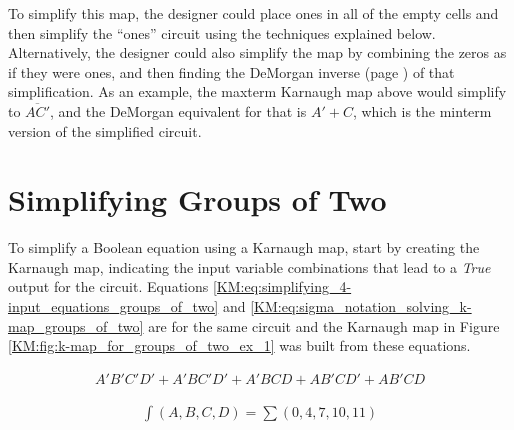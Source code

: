 To simplify this map, the designer could place ones in all of the empty cells and then simplify the ``ones'' circuit using the techniques explained below. Alternatively, the designer could also simplify the map by combining the zeros as if they were ones, and then finding the DeMorgan inverse (page  \pageref{BF:sec:demorgans_theorem}) of that simplification. As an example, the maxterm Karnaugh map above would simplify to $ \overline{AC'} $, and the DeMorgan equivalent for that is $ A'+C $, which is the minterm version of the simplified circuit.

\section{Simplifying Groups of Two}
\label{KM:sec:simplifying_groups_of_two}

To simplify a Boolean equation using a Karnaugh map, start by creating the Karnaugh map, indicating the input variable combinations that lead to a \emph{True} output for the circuit. Equations \ref{KM:eq:simplifying_4-input_equations_groups_of_two} and \ref{KM:eq:sigma_notation_solving_k-map_groups_of_two} are for the same circuit and the Karnaugh map in Figure \ref{KM:fig:k-map_for_groups_of_two_ex_1} was built from these equations. 

\begin{align}
  \label{KM:eq:simplifying_4-input_equations_groups_of_two}
  A'B'C'D'+A'BC'D'+A'BCD+AB'CD'+AB'CD
\end{align}

\begin{align}
  \label{KM:eq:sigma_notation_solving_k-map_groups_of_two}
  \int{(A,B,C,D)} = \sum(0,4,7,10,11)
\end{align}

